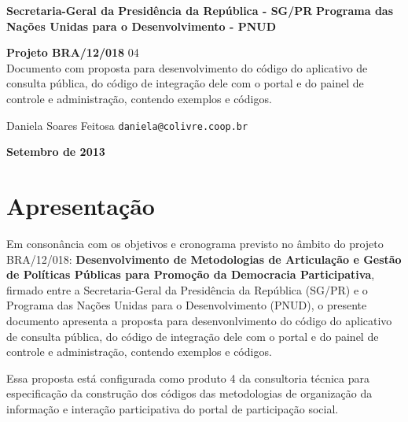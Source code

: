 \documentclass[11pt]{article}
\makeatletter
\newcommand{\MyName}{Daniela Soares Feitosa}
\newcommand{\MyEmail}{daniela@colivre.coop.br}
\newcommand{\ProductNumber}{04}
\newcommand{\ProductDescription}{Documento com proposta para
desenvolvimento do código do aplicativo de consulta pública, do código
de integração dele com o portal e do painel de controle e administração,
contendo exemplos e códigos.}
\newcommand{\MesEntrega}{Setembro de 2013}
\makeatother
\begin{document}
\lstset{language=Ruby}


\clearpage


\begin{titlepage}
  \begin{center}
   {\Large \textbf{Secretaria-Geral da Presidência da República - SG/PR}
    \newline
    \Large \textbf{Programa das Nações Unidas para o Desenvolvimento -
PNUD}}

   \vspace{2cm}
   {\large \textbf{Projeto BRA/12/018}}
   \vspace{2cm}
   {\large {\ProductNumber \\
     \ProductDescription}}
   \vspace{5cm}

   \begin{minipage}{1\textwidth}
    \MyName
    \newline
    \texttt{\MyEmail}
  \end{minipage}
  \vfill

\vspace{2cm}

\large \textbf{\MesEntrega}
\end{center}
\end{titlepage}

\tableofcontents
\clearpage
\listoffigures

\clearpage

\section{Apresentação}

Em consonância com os objetivos e cronograma previsto no âmbito do
projeto BRA/12/018:
\textbf{Desenvolvimento de Metodologias de Articulação e Gestão de
Políticas Públicas para Promoção da Democracia Participativa},
firmado entre a Secretaria-Geral da Presidência da República
(SG/PR) e o Programa das Nações Unidas para o Desenvolvimento (PNUD),
o presente documento apresenta a proposta para
desenvonlvimento do código do aplicativo de consulta pública, do código
de integração dele com o portal e do painel de controle e
administração, contendo exemplos e códigos.

Essa proposta está configurada como produto 4 da consultoria técnica
para especificação da construção dos códigos das metodologias de
organização da informação e interação participativa do portal de
participação social.
\end{document}
